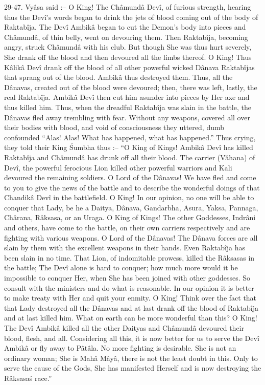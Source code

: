 29-47. Vy\^asa said :-- O King! The Ch\^amund\^a Dev\^i, of furious strength, hearing thus the Dev\^i's words began to drink the jets of blood coming out of the body of Raktab\^ija. The Dev\^i Ambik\^a began to cut the Demon's body into pieces and Ch\^amund\^a, of thin belly, went on devouring them. Then Raktab\^ija, becoming angry, struck Ch\^amund\^a with his club. But though She was thus hurt severely, She drank off the blood and then devoured all the limbs thereof. O King! Thus K\^alik\^a Dev\^i drank off the blood of all other powerful wicked D\^anava Raktab\^ijas that sprang out of the blood. Ambik\^a thus destroyed them. Thus, all the D\^anavas, created out of the blood were devoured; then, there was left, lastly, the real Raktab\^ija. Ambik\^a Dev\^i then cut him asunder into pieces by Her axe and thus killed him. Thus, when the dreadful Raktab\^ija was slain in the battle, the D\^anavas fled away trembling with fear. Without any weapons, covered all over their bodies with blood, and void of consciousness they uttered, dumb confounded ``Alas! Alas! What has happened, what has happened.'' Thus crying, they told their King \'Sumbha thus :-- ``O King of Kings! Ambik\^a Dev\^i has killed Raktab\^ija and Ch\^amund\^a has drunk off all their blood. The carrier (V\^ahana) of Dev\^i, the powerful ferocious Lion killed other powerful warriors and Kali devoured the remaining soldiers. O Lord of the D\^anavas! We have fled and come to you to give the news of the battle and to describe the wonderful doings of that Chandik\^a Dev\^i in the battlefield. O King! In our opinion, no one will be able to conquer that Lady, be he a Daitya, D\^anava, Gandarbha, Asura, Yaksa, Pannaga, Ch\^arana, R\^aksasa, or an Uraga. O King of Kings! The other Goddesses, Indr\^ani and others, have come to the battle, on their own carriers respectively and are fighting with various weapons. O Lord of the D\^anavas! The D\^anava forces are all slain by them with the excellent weapons in their hands. Even Raktab\^ija has been slain in no time. That Lion, of indomitable prowess, killed the R\^aksasas in the battle; The Dev\^i alone is hard to conquer; how much more would it be impossible to conquer Her, when She has been joined with other goddesses. So consult with the ministers and do what is reasonable. In our opinion it is better to make treaty with Her and quit your enmity. O King! Think over the fact that that Lady destroyed all the D\^anavas and at last drank off the blood of Raktab\^ija and at last killed him. What on earth can be more wonderful than this? O King! The Dev\^i Ambik\^a killed all the other Daityas and Ch\^amund\^a devoured their blood, flesh, and all. Considering all this, it is now better for us to serve the Dev\^i Ambik\^a or fly away to P\^at\^ala. No more fighting is desirable. She is not an ordinary woman; She is Mah\^a M\^ay\^a, there is not the least doubt in this. Only to serve the cause of the Gods, She has manifested Herself and is now destroying the R\^aksasa\'s race.''

